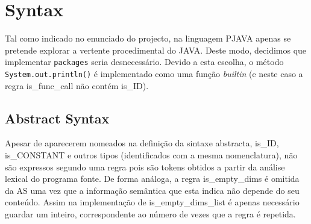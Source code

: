 \documentclass[a4paper]{article}
\title{\documentTitle}
\author{\documentAuthors{}}
\begin{document}
\renewcommand{\figurename}{Figure}
\maketitle
\cleardoublepage

\tableofcontents
\cleardoublepage

\setlength{\parindent}{1cm}
\setlength{\parskip}{0.3cm}

\section {Syntax}
\indent \indent Tal como indicado no enunciado do projecto, na linguagem PJAVA apenas se pretende explorar a vertente procedimental do JAVA. 
Deste modo, decidimos que implementar \texttt{packages} seria desnecessário.
Devido a esta escolha, o método \texttt{System.out.println()} é implementado como uma função \emph{builtin} (e neste caso a regra is\_func\_call não contém is\_ID). 

\cleardoublepage
\subsection{Abstract Syntax}
\indent \indent Apesar de aparecerem nomeados na definição da sintaxe abstracta, is\_ID, \\
is\_CONSTANT e outros tipos (identificados com a mesma nomenclatura),
não são expressos segundo uma regra pois são tokens obtidos a partir da análise lexical do programa fonte.
De forma análoga, a regra is\_empty\_dims é omitida da AS uma vez que a informação semântica que esta indica não depende do seu conteúdo.
Assim na implementação de is\_empty\_dims\_list é apenas necessário guardar um inteiro, correspondente ao número de vezes que a regra é repetida.
\end{document}
